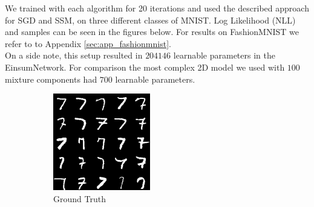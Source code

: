We trained with each algorithm for 20 iterations and used the described approach for SGD and SSM, on three different classes of MNIST. 
Log Likelihood (NLL) and samples can be seen in the figures below.
For results on FashionMNIST we refer to to Appendix \ref{sec:app_fashionmnist}. \\

On a side note, this setup resulted in $204146$ learnable parameters in the EinsumNetwork. For comparison the most 
complex 2D model we used with $100$ mixture components had $700$ learnable parameters. 

\begin{figure}[H]
    \centering
    \begin{subfigure}[b]{0.24\textwidth}
        \centering
        \includegraphics[width=\textwidth]{figures/einsum/mnist/[7]_ground_truth.png}
        \caption{Ground Truth}
    \end{subfigure}
    \begin{subfigure}[b]{0.24\textwidth}
        \centering

\end{subfigure}
\end{figure}

